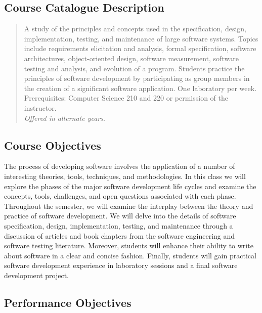 \subsection*{Course Catalogue Description}

\begin{quote}

	A study of the principles and concepts used in the specification, design, implementation, testing, and maintenance
	of large software systems. Topics include requirements elicitation and analysis, formal specification, software
	architectures, object-oriented design, software measurement, software testing and analysis, and evolution of a
	program.  Students practice the principles of software development by participating as group members in the creation
	of a significant software application. One laboratory per week. Prerequisites: Computer Science 210 and 220 or
	permission of the instructor. \\ {\em Offered in alternate years}.

\end{quote}

\subsection*{Course Objectives}

The process of developing software involves the application of a number of interesting theories, tools, techniques, and
methodologies.  In this class we will explore the phases of the major software development life cycles and examine the
concepts, tools, challenges, and open questions associated with each phase.  Throughout the semester, we will
examine the interplay between the theory and practice of software development.  We will delve into the details of
software specification, design, implementation, testing, and maintenance through a discussion of articles and book
chapters from the software engineering and software testing literature.  Moreover, students will enhance their ability
to write about software in a clear and concise fashion.  Finally, students will gain practical software development
experience in laboratory sessions and a final software development project.

\subsection*{Performance Objectives}

